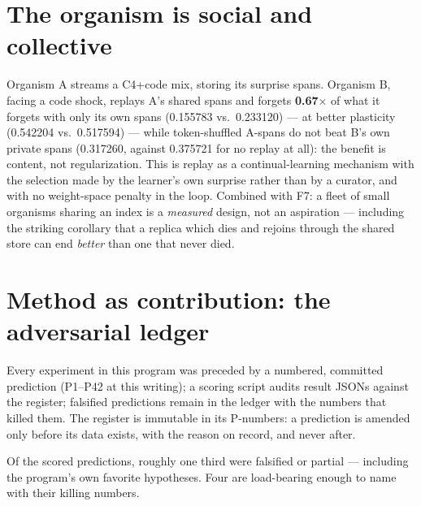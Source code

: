 \documentclass[11pt]{article}
\theoremstyle{definition}
\begin{document}
\section{The organism is social and collective}

Organism A streams a C4+code mix, storing its surprise spans. Organism B,
facing a code shock, replays A's shared spans and forgets \textbf{0.67$\times$}
of what it forgets with only its own spans (0.155783 vs.\ 0.233120) --- at
better plasticity (0.542204 vs.\ 0.517594) --- while token-shuffled A-spans
do not beat B's own private spans (0.317260, against 0.375721 for no replay
at all): the benefit is content, not regularization. This is replay as a continual-learning
mechanism \cite{vandeven2019replay} with the selection made by the
learner's own surprise rather than by a curator, and with no weight-space
penalty \cite{kirkpatrick2017ewc} in the loop. Combined with F7: a fleet of
small organisms sharing an index is a \emph{measured} design, not an
aspiration --- including the striking corollary that a replica which dies
and rejoins through the shared store can end \emph{better} than one that
never died.

\section{Method as contribution: the adversarial ledger}
\label{sec:ledger}

Every experiment in this program was preceded by a numbered, committed
prediction (P1--P42 at this writing); a scoring script audits result JSONs
against the register; falsified predictions remain in the ledger with the
numbers that killed them. The register is immutable in its P-numbers: a
prediction is amended only before its data exists, with the reason on
record, and never after.

Of the scored predictions, roughly one third were falsified or partial ---
including the program's own favorite hypotheses. Four are load-bearing
enough to name with their killing numbers.
\end{document}
